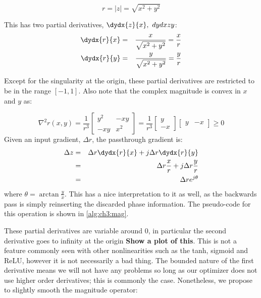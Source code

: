 \begin{equation}
  r = |z| =  \sqrt{x^2 + y^2}
\end{equation}

This has two partial derivatives, $\dydx{z}{x},\ dydx{z}{y}$:
\begin{eqnarray}
  \dydx{r}{x} & = & \frac{x}{\sqrt{x^2 + y^2}} = \frac{x}{r}\\
  \dydx{r}{y} & = & \frac{y}{\sqrt{x^2 + y^2}} = \frac{y}{r} 
\end{eqnarray}

Except for the singularity at the origin, these partial derivatives are restricted to be in the
range $[-1, 1]$. Also note that the complex magnitude is convex in $x$ and $y$ as:

\begin{equation}
\nabla^2 r(x,y) = \frac{1}{r^3} 
\begin{bmatrix}
  y^2 & -xy \\
  -xy & x^2
\end{bmatrix}
 = \frac{1}{r^3} \begin{bmatrix} y \\ -x \end{bmatrix} 
 \begin{bmatrix} y & -x \end{bmatrix} \geq 0 
\end{equation}
Given an input gradient, $\Delta r$, the passthrough gradient is:
\begin{eqnarray}
  \Delta z & = & \Delta r \dydx{r}{x} + j\Delta r \dydx{r}{y} \\
           &= & \Delta r \frac{x}{r} + j\Delta r \frac{y}{r} \\
           &=& \Delta r e^{j\theta}
\end{eqnarray}
where $\theta = \arctan{\frac{y}{x}}$. This has a nice interpretation to it as
well, as the backwards pass is simply reinserting the discarded phase
information. The pseudo-code for this operation is shown in
\autoref{alg:ch3:mag}.

These partial derivatives are variable around 0, in particular the second
derivative goes to infinity at the origin \textbf{Show a plot of this}. This is not a
feature commonly seen with other nonlinearities such as the tanh, sigmoid and
ReLU, however it is not necessarily a bad thing. The bounded nature of the first
derivative means we will not have any problems so long as our optimizer does not
use higher order derivatives; this is commonly the case. Nonetheless, we
propose to slightly smooth the magnitude operator:

